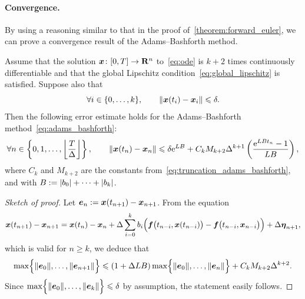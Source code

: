 \paragraph{Convergence.}
By using a reasoning similar to that in the proof of~\cref{theorem:forward_euler},
we can prove a convergence result of the Adams--Bashforth method.
\begin{theorem}
    \label{theorem:adams_bashforth}
    Assume that the solution $\vect x\colon [0, T] \to \real^n$ to~\eqref{eq:ode} is $k+2$ times continuously differentiable
    and that the global Lipschitz condition~\eqref{eq:global_lipschitz} is satisfied.
    Suppose also that
    \[
        \forall i \in \{0, \dotsc, k\}, \qquad
        \vecnorm{\vect x(t_i) - \vect x_i}
        \leq \delta.
    \]
    Then the following error estimate holds for the Adams--Bashforth method~\eqref{eq:adams_bashforth}:
    \begin{equation*}
        \forall n \in \left\{0, 1, \dotsc, \floor*{\frac{T}{\Delta}} \right\},
        \qquad
        \vecnorm{\vect x(t_n) - \vect x_n}
        \leq
        \delta \e^{L B} + C_k M_{k+2} \Delta^{k+1} \left( \frac{\e^{LB t_n} - 1}{LB} \right),
    \end{equation*}
    where $C_k$ and $M_{k+2}$ are the constants from~\eqref{eq:truncation_adams_bashforth},
    and with $B := \abs{b_0} + \dotsb + \abs{b_k}$.
\end{theorem}
\begin{proof}
    [Sketch of proof]
    Let $\vect e_n := \vect x(t_{n+1}) - \vect x_{n+1}$.
    From the equation
    \[
        \vect x(t_{n+1}) - \vect x_{n+1} =
        \vect x(t_{n}) - \vect x_n + \Delta \sum_{i=0}^{k} b_i \Bigl( \vect f\bigl(t_{n-i}, \vect x(t_{n-i})\bigr) -  \vect f\bigl(t_{n-i}, \vect x_{n-i}\bigr) \Bigr)
        + \Delta \vect \eta_{n+1},
    \]
    which is valid for $n \geq k$,
    we deduce that
    \[
        \max\Bigl\{\vecnorm{\vect e_{0}},  \dotsc  , \vecnorm{\vect e_{n+1}} \Bigr\} \leq \left(1 + \Delta L B\right) \max\Bigl\{\vecnorm{\vect e_{0}},  \dotsc  , \vecnorm{\vect e_{n}} \Bigr\} + C_k M_{k+2} \Delta^{k+2}.
    \]
    Since $\max\Bigl\{\vecnorm{\vect e_{0}},  \dotsc  , \vecnorm{\vect e_{k}} \Bigr\} \leq \delta$ by assumption,
    the statement easily follows.
\end{proof}

